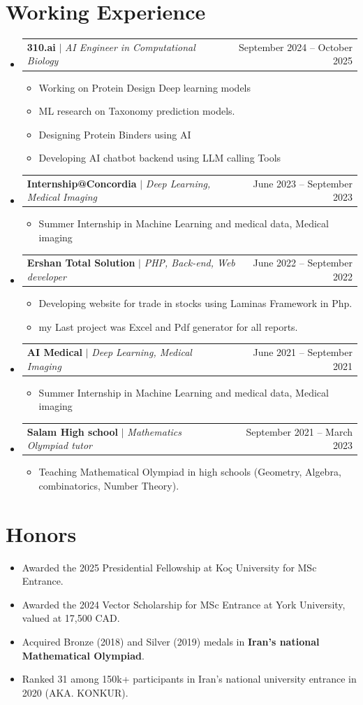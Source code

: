 \documentclass[letterpaper,11pt]{article}
\makeatletter
\newcommand{\resumeItem}[1]{\item\small{#1\vspace{-2pt}}}
\newcommand{\resumeProjectHeading}[2]{
    \item
    \begin{tabular*}{0.97\textwidth}{l@{\extracolsep{\fill}}r}
      \small#1 & #2 \\
    \end{tabular*}\vspace{-7pt}
}
\newcommand{\resumeSubHeadingListStart}{\begin{itemize}[leftmargin=0.15in, label={}]}
\newcommand{\resumeSubHeadingListEnd}{\end{itemize}}
\newcommand{\resumeItemListStart}{\begin{itemize}}
\newcommand{\resumeItemListEnd}{\end{itemize}\vspace{-5pt}}
\makeatother
\begin{document}
\section{Working Experience}
    \resumeSubHeadingListStart
        \resumeProjectHeading
        {\textbf{310.ai} $|$ \footnotesize\emph{AI Engineer in Computational Biology}}{September 2024 -- October 2025}
        \resumeItemListStart
            \resumeItem{Working on Protein Design Deep learning models}
            \resumeItem{ML research on Taxonomy prediction models.}
            \resumeItem{Designing Protein Binders using AI}
            \resumeItem{Developing AI chatbot backend using LLM calling Tools}
        \resumeItemListEnd

        \resumeProjectHeading
        {\textbf{Internship@Concordia} $|$ \footnotesize\emph{Deep Learning, Medical Imaging}}{June 2023 -- September 2023}
        \resumeItemListStart
            \resumeItem{Summer Internship in Machine Learning and medical data, Medical imaging}
        \resumeItemListEnd

        \resumeProjectHeading
        {\textbf{Ershan Total Solution} $|$ \footnotesize\emph{PHP, Back-end, Web developer}}{June 2022 -- September 2022}
        \resumeItemListStart
            \resumeItem{Developing website for trade in stocks using Laminas Framework in Php.}
            \resumeItem{my Last project was Excel and Pdf generator for all reports.}
        \resumeItemListEnd

        \resumeProjectHeading
        {\textbf{AI Medical} $|$ \footnotesize\emph{Deep Learning, Medical Imaging}}{June 2021 -- September 2021}
        \resumeItemListStart
            \resumeItem{Summer Internship in Machine Learning and medical data, Medical imaging}
        \resumeItemListEnd

        \resumeProjectHeading
        {\textbf{Salam High school} $|$ \footnotesize\emph{Mathematics Olympiad tutor}}{September 2021 -- March 2023}
        \resumeItemListStart
            \resumeItem{Teaching Mathematical Olympiad in high schools (Geometry, Algebra, combinatorics, Number Theory).}
        \resumeItemListEnd
    \resumeSubHeadingListEnd

\section{Honors}
    \resumeItemListStart
        \resumeItem{Awarded the 2025 Presidential Fellowship at Ko\c{c} University for MSc Entrance.}
        \resumeItem{Awarded the 2024 Vector Scholarship for MSc Entrance at York University, valued at 17,500 CAD.}
        \resumeItem{Acquired Bronze (2018) and Silver (2019) medals in \textbf{Iran's national Mathematical Olympiad}.}
        \resumeItem{Ranked 31 among 150k+ participants in Iran's national university entrance in 2020 (AKA. KONKUR).}
    \resumeItemListEnd
\end{document}
